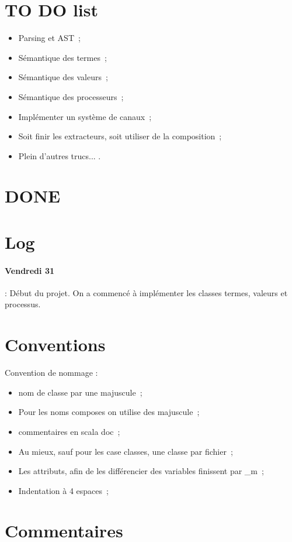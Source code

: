 \documentclass{article}
\begin{document}
\newcommand{\vic}[1]{\textcolor{blue}{#1}}
\newcommand{\fra}[1]{\textcolor{red}{#1}}



\section{TO DO list}
\begin{itemize}
  \item Parsing et AST~;
  \item Sémantique des termes~; 
  \item Sémantique des valeurs~;
  \item Sémantique des processeurs~;
  \item Implémenter un système de canaux~;
  \item Soit finir les extracteurs, soit utiliser de la composition~;
  \item Plein d'autres trucs... .
\end{itemize}
\section{DONE}
\section{Log}

\paragraph{ Vendredi 31 } : Début du projet. On a commencé à implémenter les classes termes, valeurs et processus.
\section{Conventions}

Convention de nommage :
\begin{itemize}
\item nom de classe par une majuscule~;
\item Pour les noms composes on utilise des majuscule~;
\item commentaires en scala doc~;
\item Au mieux, sauf pour les case classes, une classe par fichier~;
\item Les attributs, afin de les différencier des variables finissent par \_m~;
\item Indentation à 4 espaces~;
\end{itemize}
\section{Commentaires}
\end{document}
